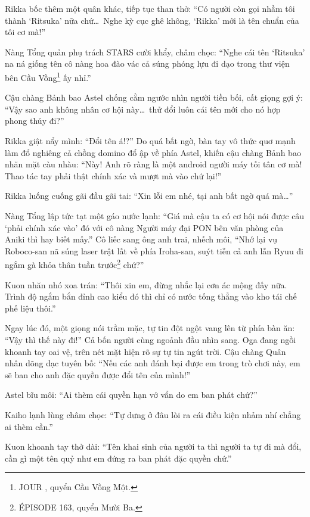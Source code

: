 \documentclass[../main.tex]{subfiles}
\begin{document}
Rikka bốc thêm một quân khác, tiếp tục than thở: ``Có người còn gọi nhầm tôi thành `Ritsuka' nữa chứ\dots\ Nghe kỳ cục ghê không, `Rikka' mới là tên chuẩn của tôi cơ mà!''

Nàng Tổng quản phụ trách STARS cười khẩy, châm chọc: ``Nghe cái tên `Ritsuka' na ná giống tên cô nàng hoa đào vác cả súng phóng lựu đi dạo trong thư viện bên Cầu Vồng\footnote{{\flaregothic JOUR }, quyển Cầu Vồng Một.} ấy nhỉ.''

Cậu chàng Bảnh bao Astel chống cằm ngước nhìn người tiền bối, cất giọng gợi ý: ``Vậy sao anh không nhân cơ hội này\dots\ thử đổi luôn cái tên mới cho nó hợp phong thủy đi?''

Rikka giật nẩy mình: ``Đổi tên á!?'' Do quá bất ngờ, bàn tay vô thức quơ mạnh làm đổ nghiêng cả chồng domino đổ ập về phía Astel, khiến cậu chàng Bảnh bao nhăn mặt càu nhàu: ``Này! Anh rõ ràng là một android người máy tối tân cơ mà! Thao tác tay phải thật chính xác và mượt mà vào chứ lại!''


Rikka luống cuống gãi đầu gãi tai: ``Xin lỗi em nhé, tại anh bất ngờ quá mà\dots''

Nàng Tổng lập tức tạt một gáo nước lạnh: ``Giá mà cậu ta có cơ hội nói được câu `phải chính xác vào' đó với cô nàng Người máy đại PON bên văn phòng của Aniki thì hay biết mấy.'' Cô liếc sang ông anh trai, nhếch môi, ``Nhớ lại vụ Roboco-san nã súng laser trật lất về phía Iroha-san, suýt tiễn cả anh lẫn Ryuu đi ngắm gà khỏa thân tuần trước\footnote{{\flaregothic ÉPISODE 163}, quyển Mười Ba.} chứ?''

Kuon nhăn nhó xoa trán: ``Thôi xin em, đừng nhắc lại cơn ác mộng đấy nữa. Trình độ ngắm bắn đỉnh cao kiểu đó thì chỉ có nước tống thẳng vào kho tái chế phế liệu thôi.''

Ngay lúc đó, một giọng nói trầm mặc, tự tin đột ngột vang lên từ phía bàn ăn: ``Vậy thì thế này đi!'' Cả bốn người cùng ngoảnh đầu nhìn sang. Oga đang ngồi khoanh tay oai vệ, trên nét mặt hiện rõ sự tự tin ngút trời. Cậu chàng Quân nhân dõng dạc tuyên bố: ``Nếu các anh đánh bại được em trong trò chơi này, em sẽ ban cho anh đặc quyền được đổi tên của mình!''


Astel bĩu môi: ``Ai thèm cái quyền hạn vớ vẩn do em ban phát chứ?''

Kaiho lạnh lùng châm chọc: ``Tự dưng ở đâu lòi ra cái điều kiện nhảm nhí chẳng ai thèm cần.''

Kuon khoanh tay thở dài: ``Tên khai sinh của người ta thì người ta tự đi mà đổi, cần gì một tên quỷ như em đứng ra ban phát đặc quyền chứ.''
\end{document}
